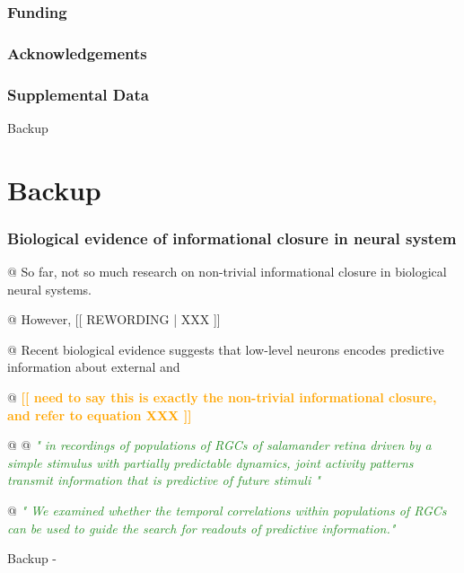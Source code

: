 \documentclass[utf8]{article}
\newenvironment{ants}
			{
			 \begin{easylist}[itemize]
		 	}
			{
			\end{easylist}
			} %
\newcommand{\rewrite}[1]{\textcolor{ForestGreen}{\textit{"#1"}}\newline}
\newcommand{\toWrite}[1]{\noindent
			\textcolor{Orange}{\textbf{[[ #1 ]]}}}
\newcommand{\rewording}[1]{\textcolor{RawSienna}{[[ REWORDING | #1 ]]}}
\newenvironment{backup}
    {
        
        \begin{tcolorbox}[enhanced,
            title=-,
            size=small,
            colbacktitle=black!70!white,
            colback=black!10!white,            
            drop fuzzy shadow,
            fontupper=\small,
            boxrule=0.4pt,
            sharp corners]
            Backup
        \end{tcolorbox}
    }
    {
        \begin{tcolorbox}[enhanced,
            halign=flush right,
            halign title=right,
            size=small,
            colbacktitle=black!10!white,
            colback=black!70!white,
            drop fuzzy shadow,
            fontupper=\small,
            boxrule=0.4pt,
            colupper=White,
            sharp corners]
            Backup -
        \end{tcolorbox}    
    }
\begin{document}
	\section*{Funding}

	\section*{Acknowledgements}

	\section*{Supplemental Data}

	
	


\newpage
\begin{backup}
\part*{Backup}
\setcounter{section}{0}
	\section*{Biological evidence of informational closure in neural system}
		\begin{ants}


			@ So far, not so much research on non-trivial informational closure in biological neural systems.

			@ However, \rewording{XXX}

			@ Recent biological evidence suggests that low-level neurons encodes predictive information about external  and

			@ \toWrite{
				need to say this is exactly the non-trivial informational closure, and refer to equation XXX}

			@ \cite{sederberg2018learning}
			@ \rewrite{
				in recordings of populations of RGCs of salamander retina driven by a simple stimulus with partially predictable dynamics, joint activity patterns transmit information that is predictive of future stimuli }

			@ \rewrite{
				We examined whether the temporal correlations within populations of RGCs can be used to guide the search for readouts of predictive information.}


\end{ants}
\end{backup}
\end{document}
